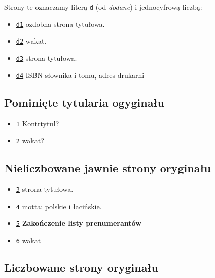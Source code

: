 \documentclass[12]{mwart}
\begin{document}
Strony te oznaczamy literą \texttt{d} (od \textit{dodane}) i
jednocyfrową liczbą:
\begin{itemize}
\item \href{\pavia{6-1}{1}}{\texttt{d1}} ozdobna strona tytułowa.
\item \href{\pavia{6-1}{2}}{\texttt{d2}} wakat.
\item \href{\pavia{6-1}{3}}{\texttt{d3}} strona tytułowa.
\item \href{\pavia{6-1}{4}}{\texttt{d4}} ISBN słownika i tomu, adres drukarni
\end{itemize}

\subsection{Pominięte tytularia ogyginału}
\label{sec:pomin-tytul-ogyg}

\begin{itemize}
\item {}{\texttt{1}} Kontrtytuł?
\item {}{\texttt{2}} wakat?
\end{itemize}



\subsection{Nieliczbowane jawnie strony oryginału}
\label{sec:tytularia-oryginau}

\begin{itemize}
\item \href{\pavia{6-1}{5}}{\texttt{3}}  strona tytułowa.
\item \href{\pavia{6-1}{6}}{\texttt{4}} motta: polskie i łacińskie.
\item \href{\pavia{6-1}{7}}{\texttt{5}} \textbf{Zakończenie listy prenumerantów}
\item \href{\pavia{6-1}{8}}{\texttt{6}} wakat
\end{itemize}

\subsection{Liczbowane strony oryginału}
\label{sec:liczb-strony-oryg}
\end{document}
